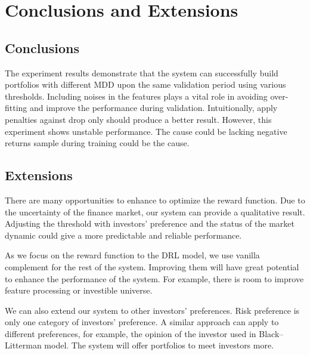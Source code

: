 \chapter{Conclusions and Extensions}
\label{c:conclusion}
\section{Conclusions}
The experiment results demonstrate that the system can successfully build portfolios with different MDD upon the same validation period using various thresholds. Including noises in the features plays a vital role in avoiding over-fitting and improve the performance during validation. Intuitionally, apply penalties against drop only should produce a better result. However, this experiment shows unstable performance. The cause could be lacking negative returns sample during training could be the cause.


\section{Extensions}

There are many opportunities to enhance to optimize the reward function. Due to the uncertainty of the finance market, our system can provide a qualitative result. Adjusting the threshold with investors' preference and the status of the market dynamic could give a more predictable and reliable performance.

As we focus on the reward function to the DRL model, we use vanilla complement for the rest of the system. Improving them will have great potential to enhance the performance of the system. For example, there is room to improve feature processing or investible universe.

\par
We can also extend our system to other investors' preferences. Risk preference is only one category of investors' preference. A similar approach can apply to different preferences, for example, the opinion of the investor used in Black–Litterman model\cite{black1992global}. The system will offer portfolios to meet investors more.  